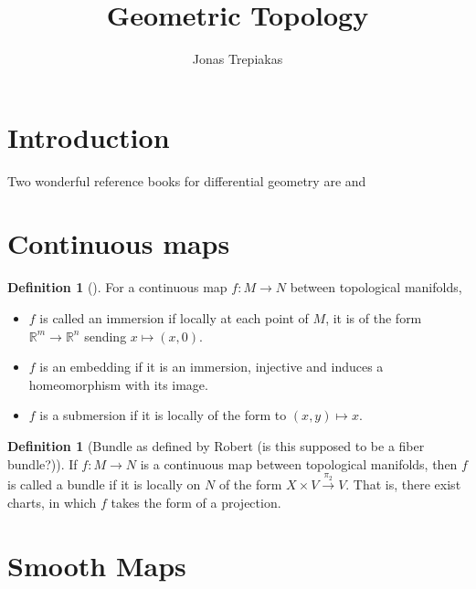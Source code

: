 \documentclass[reqno]{amsart}
\title{Geometric Topology}
\author{Jonas Trepiakas}
\date{}
\theoremstyle{definition}
\newtheorem{definition}[theorem]{Definition}
\theoremstyle{remark}
\begin{document}
\maketitle

\tableofcontents


\section{Introduction}

Two wonderful reference books for differential geometry
are \cite{KMS} and \cite{LeeSM}


\section{Continuous maps}


    \begin{definition}[]
        For a continuous map $f \colon M \to N$ between 
        topological manifolds,
        \begin{itemize}
            \item $f$ is called
                an immersion if
                locally at each point of $M$,
                it is of the form
                $\mathbb{R}^{m} \to \mathbb{R}^{n}$ 
                sending $x \mapsto \left( x,0 \right) $.
            \item $f$ is an embedding if it is
                an immersion, injective and induces a homeomorphism
                with
                its image.
            \item $f$ is a submersion if it is locally
                of the form to
                $\left( x,y \right) \mapsto x$.
        \end{itemize}
    \end{definition}

    \begin{definition}[Bundle as defined by
        Robert (is this supposed to be a fiber bundle?)]
        If 
        $f \colon M \to N$ is a continuous
        map between topological manifolds, then
        $f$ is called a bundle if it is locally
        on $N$ of the form
        $X \times V \stackrel{\pi_2}{\to } V$.
        That is, there
        exist charts, in which
        $f$ takes the form of a projection.
    \end{definition}



\section{Smooth Maps}
\end{document}

